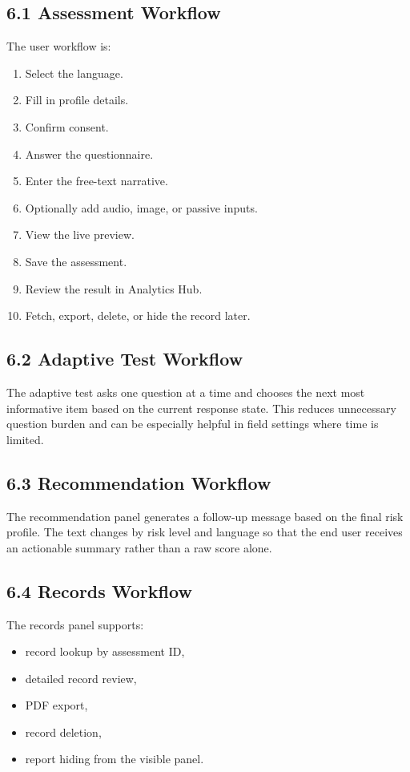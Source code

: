 \documentclass[11pt]{article}
\begin{document}
\subsection{6.1 Assessment Workflow}
The user workflow is:
\begin{enumerate}[leftmargin=*]
  \item Select the language.
  \item Fill in profile details.
  \item Confirm consent.
  \item Answer the questionnaire.
  \item Enter the free-text narrative.
  \item Optionally add audio, image, or passive inputs.
  \item View the live preview.
  \item Save the assessment.
  \item Review the result in Analytics Hub.
  \item Fetch, export, delete, or hide the record later.
\end{enumerate}

\subsection{6.2 Adaptive Test Workflow}
The adaptive test asks one question at a time and chooses the next most informative item based on the current response state. This reduces unnecessary question burden and can be especially helpful in field settings where time is limited.

\subsection{6.3 Recommendation Workflow}
The recommendation panel generates a follow-up message based on the final risk profile. The text changes by risk level and language so that the end user receives an actionable summary rather than a raw score alone.

\subsection{6.4 Records Workflow}
The records panel supports:
\begin{itemize}[leftmargin=*]
  \item record lookup by assessment ID,
  \item detailed record review,
  \item PDF export,
  \item record deletion,
  \item report hiding from the visible panel.
\end{itemize}
\end{document}
